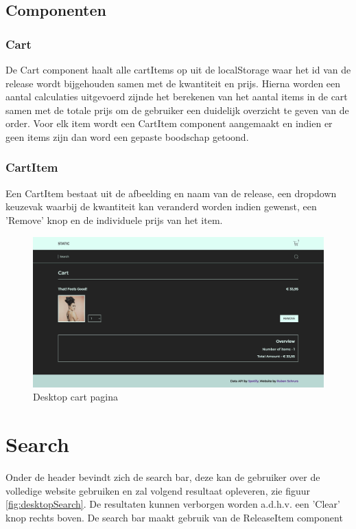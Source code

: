 \subsection{Componenten}

\subsubsection{Cart}

De Cart component haalt alle cartItems op uit de localStorage waar het id van de release wordt bijgehouden samen met de kwantiteit en prijs. Hierna worden een aantal calculaties uitgevoerd zijnde het berekenen van het aantal items in de cart samen met de totale prijs om de gebruiker een duidelijk overzicht te geven van de order. Voor elk item wordt een CartItem component aangemaakt en indien er geen items zijn dan word een gepaste boodschap getoond.

\subsubsection{CartItem}

Een CartItem bestaat uit de afbeelding en naam van de release, een dropdown keuzevak waarbij de kwantiteit kan veranderd worden indien gewenst, een 'Remove' knop en de individuele prijs van het item.

\begin{figure}
	\centering
	\includegraphics[width=1\linewidth]{graphics/desktopCart}
	\caption[Desktop cart pagina]{Desktop cart pagina}
	\label{fig:desktopCart}
\end{figure}

\section{Search}

Onder de header bevindt zich de search bar, deze kan de gebruiker over de volledige website gebruiken en zal volgend resultaat opleveren, zie figuur \ref{fig:desktopSearch}. De resultaten kunnen verborgen worden a.d.h.v. een 'Clear' knop rechts boven. De search bar maakt gebruik van de ReleaseItem component 

